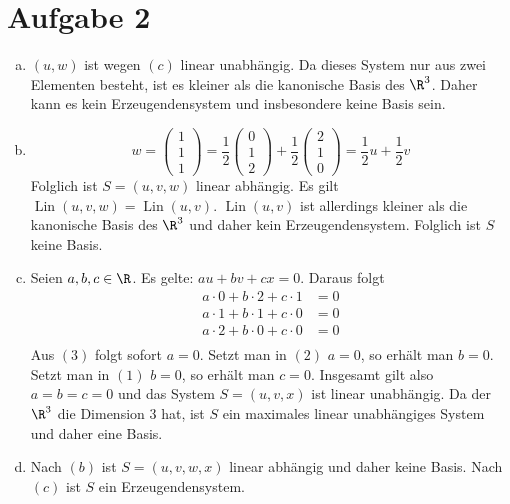 \documentclass{article}
\begin{document}
	\section*{Aufgabe 2}
	\begin{enumerate}[(a)]
		\item $(u,w)$ ist wegen $(c)$ linear unabhängig. Da dieses System nur aus zwei Elementen besteht, ist es kleiner als die kanonische Basis des $\R^3$. Daher kann es kein Erzeugendensystem und insbesondere keine Basis sein.
		\item $$w = \begin{pmatrix}1\\1\\1\end{pmatrix} = \frac{1}{2} \begin{pmatrix}0\\1\\2\end{pmatrix} + \frac{1}{2} \begin{pmatrix}2\\1\\0\end{pmatrix} = \frac{1}{2} u + \frac{1}{2} v$$
		Folglich ist $S = (u,v,w)$ linear abhängig. Es gilt $\operatorname{Lin}(u,v,w) = \operatorname{Lin}(u,v)$. $\operatorname{Lin}(u,v)$ ist allerdings kleiner als die kanonische Basis des $\R^3$ und daher kein Erzeugendensystem. Folglich ist $S$ keine Basis.
		\item Seien $a,b,c\in \R$. Es gelte: $a u + b v + c x = 0$. Daraus folgt
		\begin{align}
			a \cdot 0 + b\cdot 2 + c \cdot 1 &= 0\\
			a \cdot 1 + b\cdot 1 + c \cdot 0 &= 0\\
			a \cdot 2 + b\cdot 0 + c \cdot 0 &= 0\\
		\end{align}
		Aus $(3)$ folgt sofort $a = 0$. Setzt man in $(2)$ $a=0$, so erhält man $b = 0$. Setzt man in $(1)$ $b=0$, so erhält man $c = 0$. Insgesamt gilt also $a = b = c = 0$ und das System $S = (u,v,x)$ ist linear unabhängig. Da der $\R^3$ die Dimension 3 hat, ist $S$ ein maximales linear unabhängiges System und daher eine Basis.
		\item Nach $(b)$ ist $S = (u,v,w,x)$ linear abhängig und daher keine Basis. Nach $(c)$ ist $S$ ein Erzeugendensystem.
	\end{enumerate}
\end{document}
